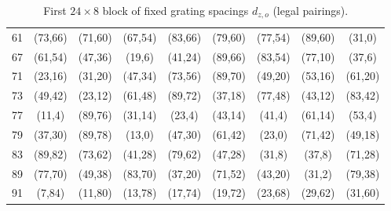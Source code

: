 \documentclass[11pt,a4paper]{article}
\begin{document}
\begin{table}[htbp]
\begin{tabular}{c|cccccccc}
61 & (73,66) & (71,60) & (67,54) & (83,66) & (79,60) & (77,54) & (89,60) & (31,0) \\
67 & (61,54) & (47,36) & (19,6) & (41,24) & (89,66) & (83,54) & (77,10) & (37,6) \\
71 & (23,16) & (31,20) & (47,34) & (73,56) & (89,70) & (49,20) & (53,16) & (61,20) \\
73 & (49,42) & (23,12) & (61,48) & (89,72) & (37,18) & (77,48) & (43,12) & (83,42) \\
77 & (11,4) & (89,76) & (31,14) & (23,4) & (43,14) & (41,4) & (61,14) & (53,4) \\
79 & (37,30) & (89,78) & (13,0) & (47,30) & (61,42) & (23,0) & (71,42) & (49,18) \\
83 & (89,82) & (73,62) & (41,28) & (79,62) & (47,28) & (31,8) & (37,8) & (71,28) \\
89 & (77,70) & (49,38) & (83,70) & (37,20) & (71,52) & (43,20) & (31,2) & (79,38) \\
91 & (7,84) & (11,80) & (13,78) & (17,74) & (19,72) & (23,68) & (29,62) & (31,60) \\
\end{tabular}
\caption{First \(24 \times 8\) block of fixed grating spacings \(d_{z,o}\) (legal pairings).}
\label{tab:d-block1}
\end{table}
\end{document}
